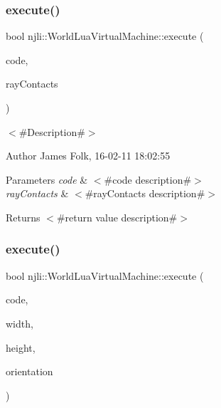 \subsubsection{\texorpdfstring{execute()}{execute()}\hspace{0.1cm}{\footnotesize\ttfamily [23/33]}}
{\footnotesize\ttfamily bool njli\+::\+World\+Lua\+Virtual\+Machine\+::execute (\begin{DoxyParamCaption}\item[{const char $\ast$}]{code,  }\item[{const bt\+Aligned\+Object\+Array$<$ \mbox{\hyperlink{classnjli_1_1_physics_ray_contact}{njli\+::\+Physics\+Ray\+Contact}} $\ast$$>$ \&}]{ray\+Contacts }\end{DoxyParamCaption})}



$<$\#\+Description\#$>$ 

\begin{DoxyAuthor}{Author}
James Folk, 16-\/02-\/11 18\+:02\+:55
\end{DoxyAuthor}

\begin{DoxyParams}{Parameters}
{\em code} & $<$\#code description\#$>$ \\
\hline
{\em ray\+Contacts} & $<$\#ray\+Contacts description\#$>$\\
\hline
\end{DoxyParams}
\begin{DoxyReturn}{Returns}
$<$\#return value description\#$>$ 
\end{DoxyReturn}
\mbox{\label{classnjli_1_1_world_lua_virtual_machine_a104f43ff49f5478040eb592686cca9fa}} 
\subsubsection{\texorpdfstring{execute()}{execute()}\hspace{0.1cm}{\footnotesize\ttfamily [24/33]}}
{\footnotesize\ttfamily bool njli\+::\+World\+Lua\+Virtual\+Machine\+::execute (\begin{DoxyParamCaption}\item[{const char $\ast$}]{code,  }\item[{\mbox{\hyperlink{_util_8h_aa62c75d314a0d1f37f79c4b73b2292e2}{s32}}}]{width,  }\item[{\mbox{\hyperlink{_util_8h_aa62c75d314a0d1f37f79c4b73b2292e2}{s32}}}]{height,  }\item[{\mbox{\hyperlink{_util_8h_aa62c75d314a0d1f37f79c4b73b2292e2}{s32}}}]{orientation }\end{DoxyParamCaption})}

